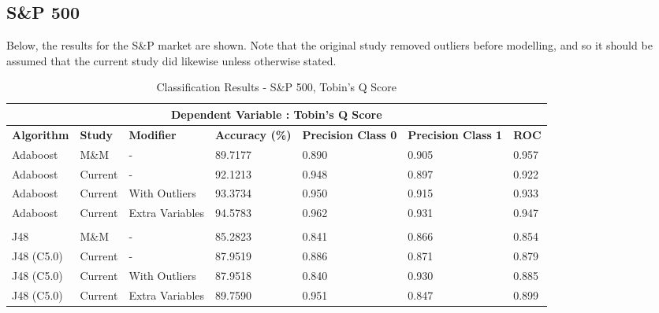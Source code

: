 \subsection*{S\&P 500}
{Below, the results for the S\&P market are shown. Note that the original study removed outliers before modelling, and so it should be assumed that the current study did likewise unless otherwise stated.   }
\begin{table}[h!]
\centering
\begin{sideways}%
\begin{tabular}{ |p{2.2cm}|p{1.55cm}|p{2.8cm}||p{2cm}|p{1.8cm}|p{1.8cm}|p{1cm}|  }
 \hline
 \multicolumn{7}{|c|}{\bf Dependent Variable : Tobin's Q Score} \\
 \hline
 {\bf Algorithm} & {\bf Study} & {\bf Modifier} & {\bf Accuracy (\%)} & {\bf Precision Class 0} & {\bf Precision Class 1} & {\bf ROC} \\
 \hline
   Adaboost & M\&M & - &  89.7177 & 0.890 &  0.905 & 0.957  \\
   \rowcolor{gray} Adaboost & Current & - & 92.1213  & 0.948 & 0.897 &  0.922 \\
   Adaboost & Current & With Outliers & 93.3734  & 0.950 & 0.915  &  0.933 \\
   \rowcolor{gray} Adaboost & Current & Extra Variables & 94.5783  & 0.962 & 0.931 &  0.947 \\
 & & & & & &\\
 J48  & M\&M & - & 85.2823  & 0.841 &  0.866 & 0.854  \\
  \rowcolor{gray} J48 (C5.0) & Current & - & 87.9519  & 0.886 & 0.871  & 0.879  \\
 J48 (C5.0)  & Current & With Outliers  &87.9518  & 0.840 & 0.930  & 0.885  \\
 \rowcolor{gray} J48 (C5.0) & Current & Extra Variables & 89.7590  & 0.951 & 0.847 &  0.899 \\
 \hline
\end{tabular}
\end{sideways}
\caption{Classification Results - S\&P 500, Tobin's Q Score}
\end{table}

